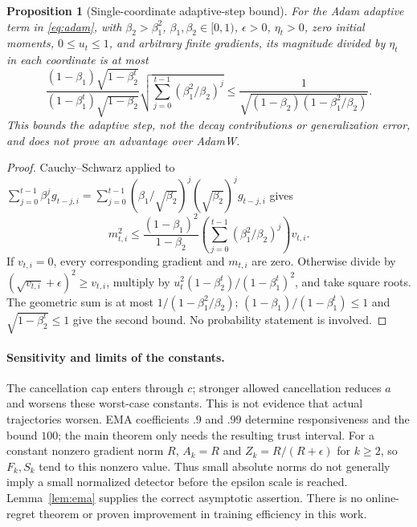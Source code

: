 \documentclass[11pt,a4paper]{article}
\newtheorem{proposition}[theorem]{Proposition}
\theoremstyle{definition}
\theoremstyle{remark}
\begin{document}
\begin{proposition}[Single-coordinate adaptive-step bound]\label{prop:spike}
For the Adam adaptive term in \eqref{eq:adam}, with $\beta_2>\beta_1^2$,
$\beta_1,\beta_2\in[0,1)$, $\epsilon>0$, $\eta_t>0$, zero initial moments,
$0\le u_t\le1$, and arbitrary finite gradients, its magnitude divided by
$\eta_t$ in each coordinate is at most
\begin{equation}\label{eq:spike}
 \frac{(1-\beta_1)\sqrt{1-\beta_2^t}}
      {(1-\beta_1^t)\sqrt{1-\beta_2}}
 \sqrt{\sum_{j=0}^{t-1}(\beta_1^2/\beta_2)^j}
 \le\frac{1}{\sqrt{(1-\beta_2)(1-\beta_1^2/\beta_2)}}.
\end{equation}
This bounds the adaptive step, not the decay contributions or generalization
error, and does not prove an advantage over AdamW.
\end{proposition}
\begin{proof}
Cauchy--Schwarz applied to
$\sum_{j=0}^{t-1}\beta_1^j g_{t-j,i}
=\sum_{j=0}^{t-1}(\beta_1/\sqrt{\beta_2})^j
 (\sqrt{\beta_2})^j g_{t-j,i}$ gives
\[
 m_{t,i}^2\le\frac{(1-\beta_1)^2}{1-\beta_2}
 \left(\sum_{j=0}^{t-1}(\beta_1^2/\beta_2)^j\right)v_{t,i}.
\]
If $v_{t,i}=0$, every corresponding gradient and $m_{t,i}$ are zero.
Otherwise divide by $(\sqrt{v_{t,i}}+\epsilon)^2\ge v_{t,i}$, multiply by
$u_t^2(1-\beta_2^t)/(1-\beta_1^t)^2$, and take square roots.
The geometric sum is at most $1/(1-\beta_1^2/\beta_2)$;
$(1-\beta_1)/(1-\beta_1^t)\le1$ and $\sqrt{1-\beta_2^t}\le1$ give the
second bound. No probability statement is involved.
\end{proof}

\paragraph{Sensitivity and limits of the constants.}
The cancellation cap enters through $c$; stronger allowed cancellation reduces
$a$ and worsens these worst-case constants. This is not evidence that actual
trajectories worsen. EMA coefficients $.9$ and $.99$ determine responsiveness
and the bound $100$; the main theorem only needs the resulting trust interval.
For a constant nonzero gradient norm $R$, $A_k=R$ and $Z_k=R/(R+\epsilon)$
for $k\ge2$, so $F_k,S_k$ tend to this nonzero value. Thus small absolute norms
do not generally imply a small normalized detector before the epsilon scale
is reached. Lemma~\ref{lem:ema} supplies the correct asymptotic assertion.
There is no online-regret theorem or proven improvement in training efficiency
in this work.
\end{document}
